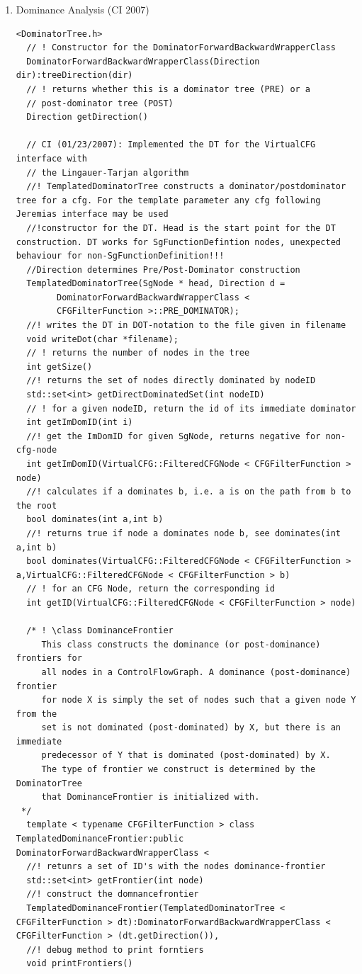 \begin{enumerate}
\begin{enumerate}
\begin{lstlisting}
      \end{lstlisting}

      \item Dominance Analysis (CI 2007)
      \begin{lstlisting}
<DominatorTree.h>
  // ! Constructor for the DominatorForwardBackwardWrapperClass
  DominatorForwardBackwardWrapperClass(Direction dir):treeDirection(dir)
  // ! returns whether this is a dominator tree (PRE) or a
  // post-dominator tree (POST)
  Direction getDirection()

  // CI (01/23/2007): Implemented the DT for the VirtualCFG interface with
  // the Lingauer-Tarjan algorithm
  //! TemplatedDominatorTree constructs a dominator/postdominator tree for a cfg. For the template parameter any cfg following Jeremias interface may be used
  //!constructor for the DT. Head is the start point for the DT construction. DT works for SgFunctionDefintion nodes, unexpected behaviour for non-SgFunctionDefinition!!!
  //Direction determines Pre/Post-Dominator construction
  TemplatedDominatorTree(SgNode * head, Direction d =
		DominatorForwardBackwardWrapperClass <
		CFGFilterFunction >::PRE_DOMINATOR);
  //! writes the DT in DOT-notation to the file given in filename		
  void writeDot(char *filename);
  // ! returns the number of nodes in the tree
  int getSize()
  //! returns the set of nodes directly dominated by nodeID
  std::set<int> getDirectDominatedSet(int nodeID)
  // ! for a given nodeID, return the id of its immediate dominator
  int getImDomID(int i)
  //! get the ImDomID for given SgNode, returns negative for non-cfg-node
  int getImDomID(VirtualCFG::FilteredCFGNode < CFGFilterFunction > node)
  //! calculates if a dominates b, i.e. a is on the path from b to the root
  bool dominates(int a,int b)
  //! returns true if node a dominates node b, see dominates(int a,int b)		
  bool dominates(VirtualCFG::FilteredCFGNode < CFGFilterFunction > a,VirtualCFG::FilteredCFGNode < CFGFilterFunction > b)
  // ! for an CFG Node, return the corresponding id
  int getID(VirtualCFG::FilteredCFGNode < CFGFilterFunction > node)

  /* ! \class DominanceFrontier
     This class constructs the dominance (or post-dominance) frontiers for
	 all nodes in a ControlFlowGraph. A dominance (post-dominance) frontier
	 for node X is simply the set of nodes such that a given node Y from the 
	 set is not dominated (post-dominated) by X, but there is an immediate
	 predecessor of Y that is dominated (post-dominated) by X.
	 The type of frontier we construct is determined by the DominatorTree
	 that DominanceFrontier is initialized with.
 */
  template < typename CFGFilterFunction > class TemplatedDominanceFrontier:public DominatorForwardBackwardWrapperClass <
  //! retunrs a set of ID's with the nodes dominance-frontier
  std::set<int> getFrontier(int node)
  //! construct the domnancefrontier
  TemplatedDominanceFrontier(TemplatedDominatorTree < CFGFilterFunction > dt):DominatorForwardBackwardWrapperClass < CFGFilterFunction > (dt.getDirection()),
  //! debug method to print forntiers
  void printFrontiers()


\end{lstlisting}
\end{enumerate}
\end{enumerate}
